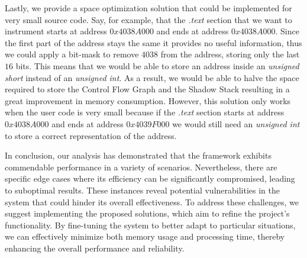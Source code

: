 Lastly, we provide a space optimization solution that could be implemented for
very small source code. Say, for example, that the \textit{.text} section that
we want to instrument starts at address $0x4038A000$ and ends at address
$0x4038A000$. Since the first part of the address stays the same it provides no useful
information, thus we could apply a bit-mask to remove $4038$ from the address, storing
only the last $16$ bits. This means that we would be able to store an address
inside an \textit{unsigned short} instead of an \textit{unsigned int}. As a result,
we would be able to halve the space required to store the Control Flow Graph and
the Shadow Stack resulting in a great improvement in memory consumption. However,
this solution only works when the user code is very small because if the \textit{.text}
section starts at address $0x4038A000$ and ends at address $0x4039F000$ we would
still need an \textit{unsigned int} to store a correct representation of the
address.

In conclusion, our analysis has demonstrated that the framework exhibits commendable
performance in a variety of scenarios. Nevertheless, there are specific edge cases
where its efficiency can be significantly compromised, leading to suboptimal
results. These instances reveal potential vulnerabilities in the system that could
hinder its overall effectiveness. To address these challenges, we suggest implementing
the proposed solutions, which aim to refine the project's functionality. By fine-tuning
the system to better adapt to particular situations, we can effectively minimize
both memory usage and processing time, thereby enhancing the overall performance
and reliability.